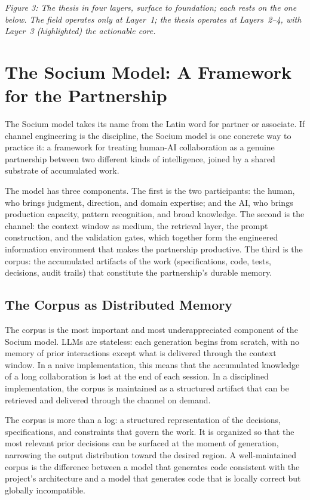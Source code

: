 \documentclass[11pt, a4paper]{article}
\begin{document}
\smallskip
{\fontsize{9}{12}\itshape\color{muted} Figure 3: The thesis in four layers, surface to foundation; each rests on the one below. The field operates only at Layer~1; the thesis operates at Layers~2--4, with Layer~3 (highlighted) the actionable core.}


\section{The Socium Model: A Framework for the Partnership}

The Socium model takes its name from the Latin word for partner or associate. If channel
engineering is the discipline, the Socium model is one concrete way to practice it: a
framework for treating human-AI collaboration as a genuine partnership between two
different kinds of intelligence, joined by a shared substrate of accumulated work.

The model has three components. The first is the two participants: the human, who brings
judgment, direction, and domain expertise; and the AI, who brings production capacity, pattern
recognition, and broad knowledge. The second is the channel: the context window
as medium, the retrieval layer, the prompt construction, and the validation gates, which
together form the engineered information environment that makes the partnership productive. The
third is the corpus: the accumulated artifacts of the work (specifications, code, tests,
decisions, audit trails) that constitute the partnership's durable memory.

\subsection{The Corpus as Distributed Memory}

The corpus is the most important and most underappreciated component of the Socium model.
LLMs are stateless: each generation begins from scratch, with no memory of prior
interactions except what is delivered through the context window. In a naive
implementation, this means that the accumulated knowledge of a long collaboration is lost
at the end of each session. In a disciplined implementation, the corpus is maintained as
a structured artifact that can be retrieved and delivered through the channel
on demand.

The corpus is more than a log: a structured representation of the decisions,
specifications, and constraints that govern the work. It is organized so that the most
relevant prior decisions can be surfaced at the moment of generation, narrowing the
output distribution toward the desired region. A well-maintained corpus is the difference
between a model that generates code consistent with the project's architecture and a
model that generates code that is locally correct but globally incompatible.
\end{document}
